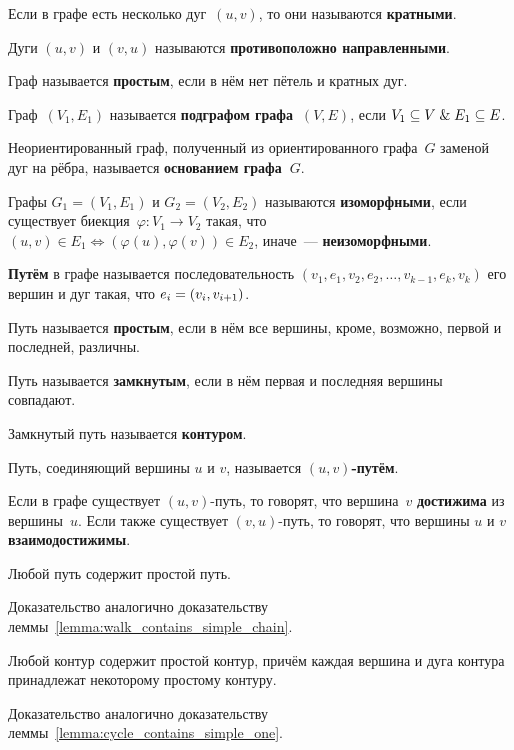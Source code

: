 Если в графе есть несколько дуг~$(u, v)$, то они называются \textbf{кратными}.

Дуги $(u, v)$ и $(v, u)$ называются \textbf{противоположно направленными}.

Граф называется \textbf{простым}, если в нём нет пётель и кратных дуг.

Граф~$(V_1, E_1)$ называется \textbf{подграфом графа~$(V, E)$}, если $V_1 \subseteq V \mathrel{\&} E_1 \subseteq E$.

Неориентированный граф, полученный из ориентированного графа~$G$ заменой дуг на рёбра, называется \textbf{основанием графа~$G$}. 

Графы $G_1 = (V_1, E_1)$ и $G_2 = (V_2, E_2)$ называются \textbf{изоморфными}, если существует биекция~$\varphi \colon V_1 \to V_2$ такая, что
$(u, v) \in E_1 \Leftrightarrow (\varphi(u), \varphi(v)) \in E_2$, иначе~--- \textbf{неизоморфными}.

 \textbf{Путём} в графе называется последовательность $(v_1, e_1, v_2, e_2, \ldots, v_{k-1}, e_k, v_k)$ его вершин и дуг такая, что $e_i \opbr= (v_i, v_{i+1})$.

Путь называется \textbf{простым}, если в нём все вершины, кроме, возможно, первой и последней, различны.

Путь называется \textbf{замкнутым}, если в нём первая и последняя вершины совпадают.

 Замкнутый путь называется \textbf{контуром}.

Путь, соединяющий вершины $u$ и $v$, называется \textbf{$(u, v)$-путём}.

Если в графе существует $(u, v)$-путь, то говорят, что вершина~$v$ \textbf{достижима} из вершины~$u$.
Если также существует $(v, u)$-путь, то говорят, что вершины $u$ и $v$ \textbf{взаимодостижимы}.

\begin{lemma}
Любой путь содержит простой путь.
\end{lemma}%
Доказательство аналогично доказательству леммы~\ref{lemma:walk_contains_simple_chain}.

\begin{lemma}
Любой контур содержит простой контур, причём каждая вершина и дуга контура принадлежат некоторому простому контуру.
\end{lemma}%
Доказательство аналогично доказательству леммы~\ref{lemma:cycle_contains_simple_one}.